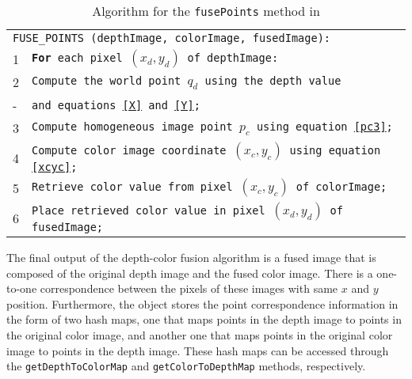 \begin{table}[ht]
\caption{Algorithm for the \texttt{fusePoints} method in \DepthColorFusion{}}
\begin{center}
\begin{tabular}{ l l }
\hline
\multicolumn{2}{l}{\texttt{FUSE\_POINTS (depthImage, colorImage, fusedImage):}} \\
1 & \texttt{{\bf For} each pixel $(x_d, y_d)$ of depthImage:} \\
2 & \hspace{0.6cm} \texttt{Compute the world point $q_d$ using the depth value} \\
- & \hspace{1.2cm} \texttt{and equations \eqref{X} and \eqref{Y};} \\
3 & \hspace{0.6cm} \texttt{Compute homogeneous image point $p_c$ using equation \eqref{pc3};} \\
4 & \hspace{0.6cm} \texttt{Compute color image coordinate $(x_c, y_c)$ using equation \eqref{xcyc};} \\
5 & \hspace{0.6cm} \texttt{Retrieve color value from pixel $(x_c, y_c)$ of colorImage;} \\
6 & \hspace{0.6cm} \texttt{Place retrieved color value in pixel $(x_d, y_d)$ of fusedImage;} \\
\hline
\end{tabular}
\end{center}
\label{fusepointsalgorithm}
\end{table}

The final output of the depth-color fusion algorithm is a fused image that is composed of the original depth 
image and the fused color image. There is a one-to-one correspondence between the pixels of these images
with same $x$ and $y$ position. Furthermore, the \DepthColorFusion{} object stores the point correspondence
information in the form of two hash maps, one that maps points in the depth image to points in the original color
image, and another one that maps points in the original color image to points in the depth image. These hash
maps can be accessed through the \texttt{get\-Depth\-To\-Col\-or\-Map} and 
\texttt{get\-Col\-or\-To\-Depth\-Map} methods, respectively.


